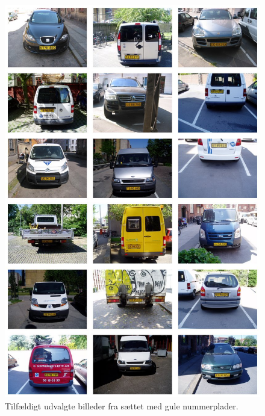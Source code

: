 \documentclass[11pt,a4paper,final]{article}
\begin{document}
\begin{figure}[htp]
\centering
\includegraphics[width=12cm]{appendix/illu/gultset.jpg} 
\caption{Tilfældigt udvalgte billeder fra sættet med gule nummerplader.}
\label{fig:illu:gultset}
\end{figure}
\end{document}
